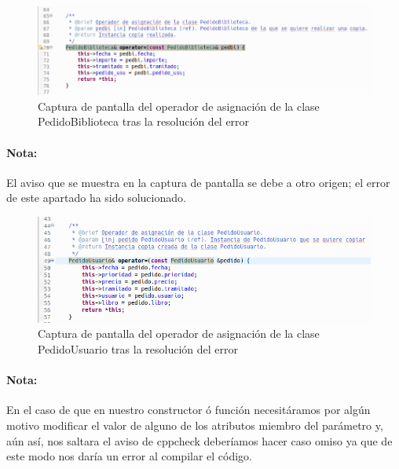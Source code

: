 		\begin{figure}[H]
			\centering
			\includegraphics[scale=0.5]{img/captura59.png}
			\caption{Captura de pantalla del operador de asignación de la clase PedidoBiblioteca tras la resolución del error}
			\label{captura59}
		\end{figure}
	
		\paragraph{Nota:}El aviso que se muestra en la captura de pantalla se debe a otro origen; el error de este apartado ha sido solucionado.
		
		\begin{figure}[H]
			\centering
			\includegraphics[scale=0.55]{img/captura60.png}
			\caption{Captura de pantalla del operador de asignación de la clase PedidoUsuario tras la resolución del error}
			\label{captura60}
		\end{figure}
		
		\paragraph{Nota:}En el caso de que en nuestro constructor ó función necesitáramos por algún motivo modificar el valor de alguno de los atributos miembro del parámetro y, aún así, nos saltara el aviso de cppcheck deberíamos hacer caso omiso ya que de este modo nos daría un error al compilar el código.
	
\newpage